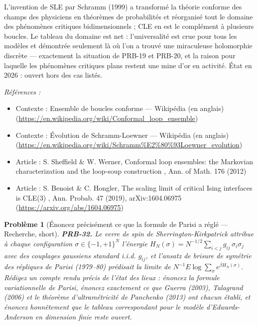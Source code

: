 \documentclass[11pt]{article}
\newtheorem{problem}{Problème}
\newenvironment{refs}{\par\small\noindent\emph{Références :}\begin{itemize}\setlength\itemsep{0pt}}{\end{itemize}\normalsize}
\begin{document}
\noindent L'invention de SLE par Schramm (1999) a transformé la théorie conforme des
champs des physiciens en théorèmes de probabilités et réorganisé tout le domaine des phénomènes
critiques bidimensionnels ; CLE en est le complément à plusieurs boucles. Le tableau du domaine est
net : l'universalité est crue pour tous les modèles et démontrée seulement là où l'on a trouvé une
miraculeuse holomorphie discrète --- exactement la situation de PRB-19 et PRB-20, et la raison pour
laquelle les phénomènes critiques plans restent une mine d'or en activité. État en 2026 : ouvert
hors des cas listés.

\begin{refs}
\item Contexte : Ensemble de boucles conforme --- Wikipédia (en anglais) (\url{https://en.wikipedia.org/wiki/Conformal_loop_ensemble})
\item Contexte : Évolution de Schramm-Loewner --- Wikipédia (en anglais) (\url{https://en.wikipedia.org/wiki/Schramm%E2%80%93Loewner_evolution})
\item Article : S. Sheffield \& W. Werner, \og{} Conformal loop ensembles: the Markovian characterization and the loop-soup construction \fg{}, Ann. of Math. 176 (2012)
\item Article : S. Benoist \& C. Hongler, \og{} The scaling limit of critical Ising interfaces is CLE(3) \fg{}, Ann. Probab. 47 (2019), arXiv:1604.06975 (\url{https://arxiv.org/abs/1604.06975})
\end{refs}

\bigskip

\begin{problem}[{Énoncez précisément ce que la formule de Parisi a réglé --- Recherche, short}]
\textbf{PRB-32.} Le verre de spin de Sherrington-Kirkpatrick attribue à chaque
configuration $ \sigma \in \{-1,+1\}^N $ l'énergie
$ H_N(\sigma) = N^{-1/2} \sum_{i < j} g_{ij}\, \sigma_i \sigma_j $ avec des couplages
gaussiens standard i.i.d. $ g_{ij} $, et l'ansatz de brisure de symétrie des répliques de Parisi
(1979--80) prédisait la limite de $ N^{-1} E \log \sum_{\sigma} e^{\beta H_N(\sigma)} $. Rédigez un
compte rendu précis de l'état des lieux : énoncez la formule variationnelle de Parisi, énoncez
exactement ce que Guerra (2003), Talagrand (2006) et le théorème d'ultramétricité de Panchenko
(2013) ont chacun établi, et énoncez honnêtement que le tableau correspondant pour le modèle
d'Edwards-Anderson en dimension finie reste ouvert.
\end{problem}
\end{document}
